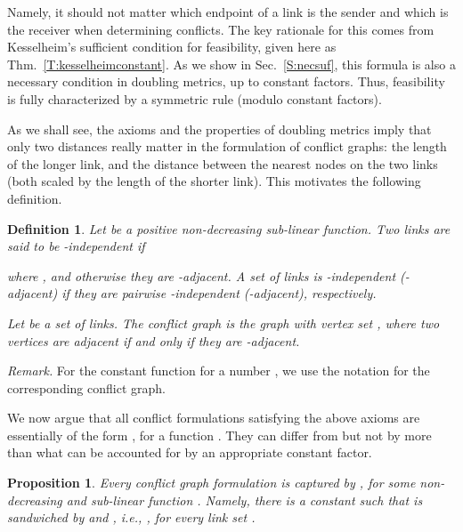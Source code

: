 \documentclass[11pt]{article}
\newtheorem{proposition}{Proposition}
\newtheorem{definition}{Definition}
\begin{document}
Namely, it should not matter which endpoint of a link is the sender and which is the receiver when
determining conflicts. The key rationale for this comes from Kesselheim's sufficient condition for feasibility,
given here as Thm.~\ref{T:kesselheimconstant}. 
As we show in Sec.\ \ref{S:necsuf}, this formula is also a necessary condition in doubling metrics, up to constant factors.
Thus, feasibility is fully characterized by a symmetric rule (modulo constant factors).

As we shall see, the axioms and the properties of doubling metrics imply that only two distances really
matter in the formulation of conflict graphs: the length of the longer link, and the distance between the
nearest nodes on the two links (both scaled by the length of the shorter link). This motivates the
following definition. 

\begin{definition}
Let  be a positive non-decreasing sub-linear function. 
Two links  are said to be \emph{-independent} if
  
where , and otherwise they are \emph{-adjacent}. 
A set of links is -independent (-adjacent) if they are pairwise -independent (-adjacent), respectively.

Let  be a set of links. The conflict graph \label{G:gf} is the graph with vertex set , where two vertices 
are adjacent if and only if they are -adjacent.
\end{definition}

\noindent \emph{Remark.}
For the constant function  for a number , 
we use the notation \label{G:ggamma} for the corresponding conflict graph.

We now argue that all conflict formulations satisfying the above axioms are essentially of the form
, for a function . They can differ from  but not by more than what can be
accounted for by an appropriate constant factor. 

\begin{proposition}
Every conflict graph formulation  is captured by , for some non-decreasing and sub-linear function .
Namely, there is a constant  such that 
 is sandwiched by   and , i.e.,
, for every link set .
\label{prop:gf-suffices}
\end{proposition}
\end{document}
